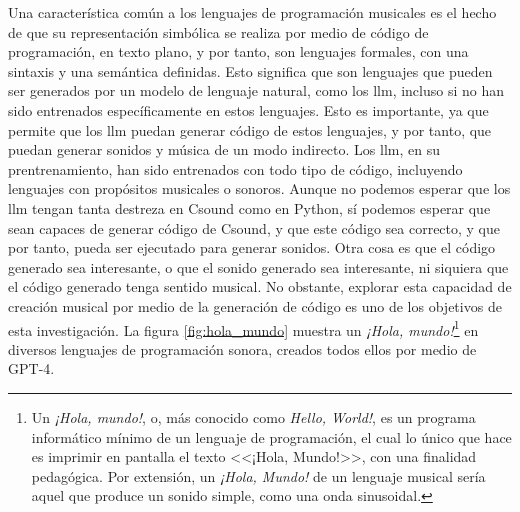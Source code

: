 Una característica común a los lenguajes de programación musicales es el hecho de que su representación simbólica se realiza por medio de código de programación, en texto plano, y por tanto, son lenguajes formales, con una sintaxis y una semántica definidas. Esto significa que son lenguajes que pueden ser generados por un modelo de lenguaje natural, como los \gls{llm}, incluso si no han sido entrenados específicamente en estos lenguajes. Esto es importante, ya que permite que los \gls{llm} puedan generar código de estos lenguajes, y por tanto, que puedan generar sonidos y música de un modo indirecto. Los \gls{llm}, en su prentrenamiento, han sido entrenados con todo tipo de código, incluyendo lenguajes con propósitos musicales o sonoros. Aunque no podemos esperar que los \gls{llm} tengan tanta destreza en Csound como en Python, sí podemos esperar que sean capaces de generar código de Csound, y que este código sea correcto, y que por tanto, pueda ser ejecutado para generar sonidos. Otra cosa es que el código generado sea interesante, o que el sonido generado sea interesante, ni siquiera que el código generado tenga sentido musical. No obstante, explorar esta capacidad de creación musical por medio de la generación de código es uno de los objetivos de esta investigación. La figura \ref{fig:hola_mundo} muestra un \emph{¡Hola, mundo!}\footnote{Un \emph{¡Hola, mundo!}, o, más conocido como \emph{Hello, World!}, es un programa informático mínimo de un lenguaje de programación, el cual lo único que hace es imprimir en pantalla el texto <<¡Hola, Mundo!>>, con una finalidad pedagógica. Por extensión, un \emph{¡Hola, Mundo!} de un lenguaje musical sería aquel que produce un sonido simple, como una onda sinusoidal.} en diversos lenguajes de programación sonora, creados todos ellos por medio de GPT-4.


